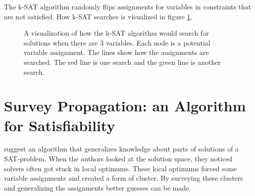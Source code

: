 \documentclass[msc,lith,english]{liuthesis}
\begin{document}
The k-SAT algorithm randomly flips assignments for variables in constraints that are not satisfied.
How k-SAT searches is visualized in figure \ref{figKSATSearch}.

\cite{sourceProbAlgo}

\begin{center}
\begin{figure}[h]
\centering
{}
\caption{A visualization of how the k-SAT algorithm would search for solutions when there are 3 variables. Each node is a potential variable assignment. The lines show how the assignments are searched. The red line is one search and the green line is another search.}
\label{figKSATSearch}
\end{figure}
\end{center}

\section{Survey Propagation: an Algorithm for Satisfiability}
\citeauthor{sourceSurveyProp} \cite{sourceSurveyProp} suggest an algorithm that generalizes knowledge about parts of solutions of a SAT-problem. 
When the authors looked at the solution space, they noticed solvers often got stuck in local optimums.
These local optimums forced some variable assignments and created a form of cluster.
By surveying these clusters and generalizing the assignments better guesses can be made.
\end{document}
